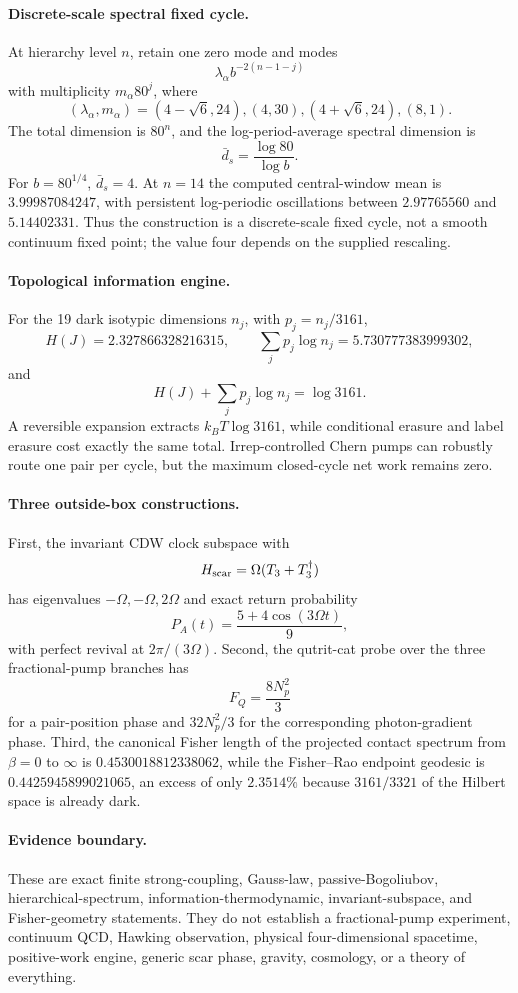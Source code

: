 \paragraph{Discrete-scale spectral fixed cycle.}
At hierarchy level $n$, retain one zero mode and modes
\[
\lambda_\alpha b^{-2(n-1-j)}
\]
with multiplicity $m_\alpha80^j$, where
\[
(\lambda_\alpha,m_\alpha)=(4-\sqrt6,24),(4,30),(4+\sqrt6,24),(8,1).
\]
The total dimension is $80^n$, and the log-period-average spectral dimension is
\[
\bar d_s=\frac{\log80}{\log b}.
\]
For $b=80^{1/4}$, $\bar d_s=4$.  At $n=14$ the computed central-window mean is $3.99987084247$, with persistent log-periodic oscillations between $2.97765560$ and $5.14402331$.  Thus the construction is a discrete-scale fixed cycle, not a smooth continuum fixed point; the value four depends on the supplied rescaling.

\paragraph{Topological information engine.}
For the 19 dark isotypic dimensions $n_j$, with $p_j=n_j/3161$,
\[
H(J)=2.327866328216315,
\qquad \sum_jp_j\log n_j=5.730777383999302,
\]
and
\[
H(J)+\sum_jp_j\log n_j=\log3161.
\]
A reversible expansion extracts $k_BT\log3161$, while conditional erasure and label erasure cost exactly the same total.  Irrep-controlled Chern pumps can robustly route one pair per cycle, but the maximum closed-cycle net work remains zero.

\paragraph{Three outside-box constructions.}
First, the invariant CDW clock subspace with
\[
H_{\rm scar}=\Omega(T_3+T_3^\dagger)
\]
has eigenvalues $-\Omega,-\Omega,2\Omega$ and exact return probability
\[
P_A(t)=\frac{5+4\cos(3\Omega t)}9,
\]
with perfect revival at $2\pi/(3\Omega)$.  Second, the qutrit-cat probe over the three fractional-pump branches has
\[
F_Q=\frac{8N_p^2}{3}
\]
for a pair-position phase and $32N_p^2/3$ for the corresponding photon-gradient phase.  Third, the canonical Fisher length of the projected contact spectrum from $\beta=0$ to $\infty$ is $0.4530018812338062$, while the Fisher--Rao endpoint geodesic is $0.4425945899021065$, an excess of only $2.3514\%$ because $3161/3321$ of the Hilbert space is already dark.

\paragraph{Evidence boundary.}
These are exact finite strong-coupling, Gauss-law, passive-Bogoliubov, hierarchical-spectrum, information-thermodynamic, invariant-subspace, and Fisher-geometry statements.  They do not establish a fractional-pump experiment, continuum QCD, Hawking observation, physical four-dimensional spacetime, positive-work engine, generic scar phase, gravity, cosmology, or a theory of everything.
